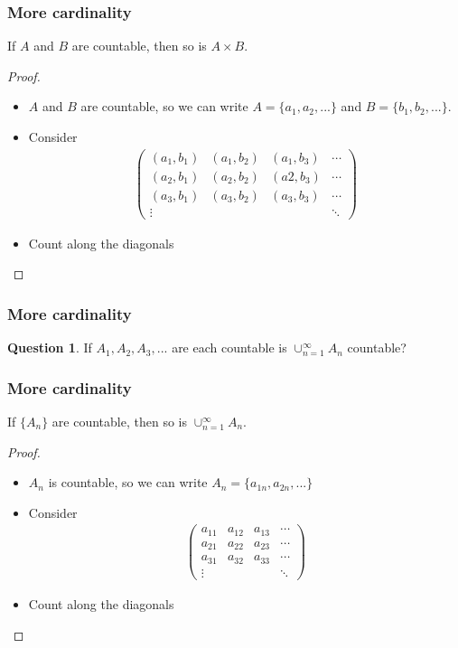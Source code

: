 \documentclass[compress]{beamer}
\theoremstyle{definition}
\newtheorem{question}{Question}
\begin{document}
\begin{frame}
  \frametitle{More cardinality}    
  \begin{theorem}
    If $A$ and $B$ are countable, then so is $A \times B$.
  \end{theorem}
  \begin{proof}
    \begin{itemize}
    \item $A$ and $B$ are countable, so we can write $A = \{a_1, a_2,
      ...\}$ and $B = \{b_1, b_2, ... \}$.
    \item Consider 
      \begin{align*}
        \begin{pmatrix} 
          (a_1, b_1) & (a_1, b_2) & (a_1, b_3) & \cdots \\
          (a_2, b_1) & (a_2, b_2) & (a2, b_3) & \cdots \\
          (a_3, b_1) & (a_3, b_2) & (a_3, b_3) & \cdots \\
          \vdots &               &           & \ddots
        \end{pmatrix}
      \end{align*}
    \item Count along the diagonals
    \end{itemize}
  \end{proof}  
\end{frame}

\begin{frame}
  \frametitle{More cardinality}    
  \begin{question}
    If $A_1, A_2, A_3, ...$ are each countable is $\cup_{n=1}^\infty
    A_n$ countable?
  \end{question}
\end{frame}

\begin{frame}
  \frametitle{More cardinality}    
  \begin{theorem}
    If $\{A_n\}$ are countable, then so is $\cup_{n=1}^\infty A_n$.
  \end{theorem}
  \begin{proof}
    \begin{itemize}
    \item $A_n$ is countable, so we can write $A_n = \{a_{1n}, a_{2n},
      ...\}$ 
    \item Consider 
      \begin{align*}
        \begin{pmatrix} 
          a_{11} & a_{12} & a_{13} & \cdots \\
          a_{21} & a_{22} & a_{23} & \cdots \\
          a_{31} & a_{32} & a_{33} & \cdots \\          
          \vdots &      &       & \ddots
        \end{pmatrix}
      \end{align*}
    \item Count along the diagonals
    \end{itemize}
  \end{proof}  
\end{frame}
\end{document}
